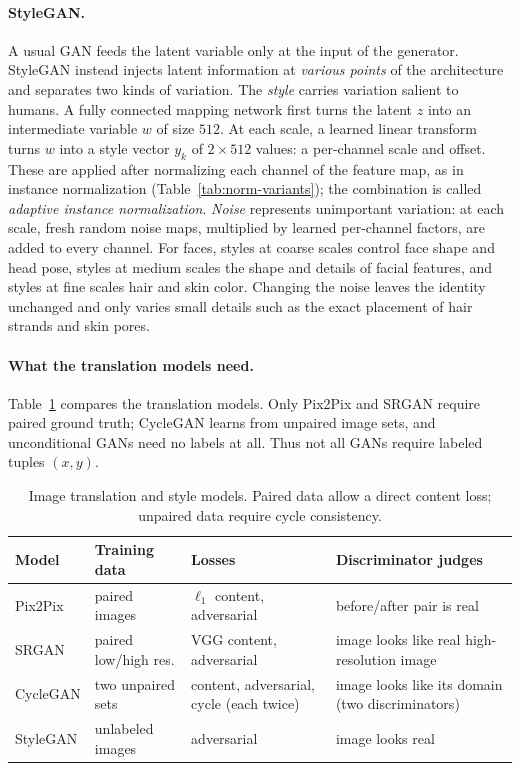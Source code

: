 \paragraph{StyleGAN.}
A usual GAN feeds the latent variable only at the input of the generator.
StyleGAN instead injects latent information at \emph{various points} of the
architecture and separates two kinds of variation. The \emph{style} carries
variation salient to humans. A fully connected mapping network first turns the
latent $z$ into an intermediate variable $w$ of size $512$. At each scale, a
learned linear transform turns $w$ into a style vector $y_k$ of $2\times512$
values: a per-channel scale and offset. These are applied after normalizing
each channel of the feature map, as in instance normalization
(Table~\ref{tab:norm-variants}); the combination is called \emph{adaptive
instance normalization}. \emph{Noise} represents unimportant variation: at
each scale, fresh random noise maps, multiplied by learned per-channel factors,
are added to every channel. For faces, styles at coarse scales control face
shape and head pose, styles at medium scales the shape and details of facial
features, and styles at fine scales hair and skin color. Changing the noise
leaves the identity unchanged and only varies small details such as the exact
placement of hair strands and skin pores.

\paragraph{What the translation models need.}
Table~\ref{tab:gan-translation} compares the translation models. Only
Pix2Pix and SRGAN require paired ground truth; CycleGAN learns from unpaired
image sets, and unconditional GANs need no labels at all. Thus not all GANs
require labeled tuples $(x,y)$.

\begin{table}[ht]
  \centering
  \begin{tabular}{@{}p{2.2cm}p{2.9cm}p{4.2cm}p{4.7cm}@{}}
    \toprule
    Model & Training data & Losses & Discriminator judges \\
    \midrule
    Pix2Pix & paired images & $\ell_1$ content, adversarial & before/after
      pair is real \\
    SRGAN & paired low/high res. & VGG content, adversarial & image looks like
      real high-resolution image \\
    CycleGAN & two unpaired sets & content, adversarial, cycle (each twice) &
      image looks like its domain (two discriminators) \\
    StyleGAN & unlabeled images & adversarial & image looks real \\
    \bottomrule
  \end{tabular}
  \caption{Image translation and style models. Paired data allow a direct
  content loss; unpaired data require cycle consistency.}
  \label{tab:gan-translation}
\end{table}
